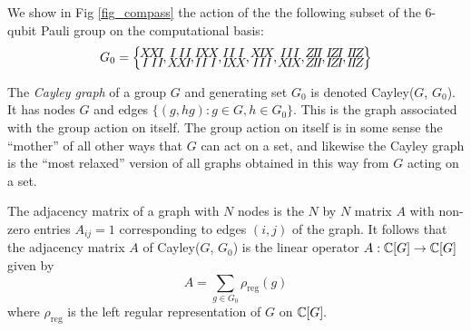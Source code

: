 \documentclass[12pt,notitlepage,longbibliography,nofootinbib,tightenlines]{revtex4}
\begin{document}
We show in Fig \ref{fig_compass} the action
of the 
the following subset of the 6-qubit Pauli group %
on the computational basis:
$$
\arraycolsep=-1pt\def\arraystretch{0.2}
G_0 = \Bigl\{
\begin{array}{ccc}
X&X&I\\
I&I&I
\end{array},
\begin{array}{ccc}
I&I&I\\
X&X&I
\end{array},
\begin{array}{ccc}
I&X&X\\
I&I&I
\end{array},
\begin{array}{ccc}
I&I&I\\
I&X&X
\end{array},
\begin{array}{ccc}
X&I&X\\
I&I&I
\end{array},
\begin{array}{ccc}
I&I&I\\
X&I&X
\end{array},
\begin{array}{ccc}
Z&I&I\\
Z&I&I
\end{array},
\begin{array}{ccc}
I&Z&I\\
I&Z&I
\end{array},
\begin{array}{ccc}
I&I&Z\\
I&I&Z
\end{array}
\Bigr\}
$$

The {\it Cayley graph} of a group $G$ and
generating set $G_0$ is denoted Cayley($G$, $G_0$).
It has nodes $G$ and edges $\{(g, hg) : g \in G, h \in G_0\}$.
This is the graph associated with the group action on itself.
The group action on itself is in some sense the ``mother'' of all other ways that
$G$ can act on a set, and likewise the Cayley graph is the ``most relaxed'' version
of all graphs obtained in this way from $G$ acting on a set.

The adjacency matrix of a graph with $N$ nodes is the 
$N$ by $N$ matrix $A$ with non-zero entries $A_{ij}=1$ corresponding
to edges $(i, j)$ of the graph.
It follows that the adjacency matrix $A$ of Cayley($G$, $G_0$)
is the linear operator $A:\mathbb{C}[G]\to\mathbb{C}[G]$
given by
$$
    A = \sum_{g\in G_0}\rho_{\mathrm{reg}}(g)
$$
where $\rho_{\mathrm{reg}}$ is the left regular representation of
$G$ on $\mathbb{C}[G].$
\end{document}
